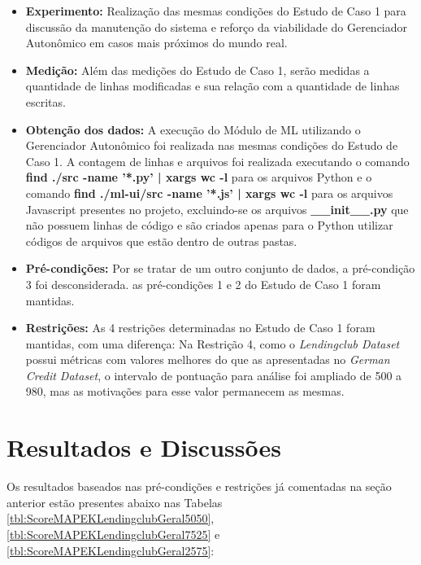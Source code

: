 \documentclass[portugues]{ic-tese}
\begin{document}
\begin{itemize}
\item \textbf{Experimento:} Realização das mesmas condições do Estudo de Caso 1 para discussão da manutenção do sistema e reforço da viabilidade do Gerenciador Autonômico em casos mais próximos do mundo real.

\item \textbf{Medição:} Além das medições do Estudo de Caso 1, serão medidas a quantidade de linhas modificadas e sua relação com a quantidade de linhas escritas.

\item \textbf{Obtenção dos dados:} A execução do Módulo de ML utilizando o Gerenciador Autonômico foi realizada nas mesmas condições do Estudo de Caso 1. A contagem de linhas e arquivos foi realizada executando o comando \textbf{find ./src -name '*.py' | xargs wc -l} para os arquivos Python e o comando \textbf{find ./ml-ui/src -name '*.js' | xargs wc -l} para os arquivos Javascript presentes no projeto, excluindo-se os arquivos \textbf{\_\_init\_\_.py} que não possuem linhas de código e são criados apenas para o Python utilizar códigos de arquivos que estão dentro de outras pastas.

\item \textbf{Pré-condições:} Por se tratar de um outro conjunto de dados, a pré-condição 3 foi desconsiderada. as pré-condições 1 e 2 do Estudo de Caso 1 foram mantidas.

\item \textbf{Restrições:} As 4 restrições determinadas no Estudo de Caso 1 foram mantidas, com uma diferença: Na Restrição 4, como o \textit{Lendingclub Dataset} possui métricas com valores melhores do que as apresentadas no \textit{German Credit Dataset}, o intervalo de pontuação para análise foi ampliado de 500 a 980, mas as motivações para esse valor permanecem as mesmas.
\end{itemize}

\section{Resultados e Discussões}

Os resultados baseados nas pré-condições e restrições já comentadas na seção anterior estão presentes abaixo nas Tabelas \ref{tbl:ScoreMAPEKLendingclubGeral5050}, \ref{tbl:ScoreMAPEKLendingclubGeral7525} e \ref{tbl:ScoreMAPEKLendingclubGeral2575}:
\end{document}
